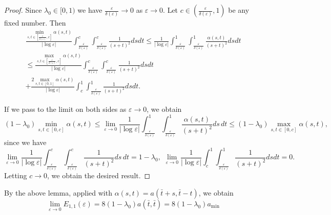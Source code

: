 \documentclass[12pt]{article}
\numberwithin{equation}{section}
\def\e{\varepsilon}
\begin{document}
\begin{proof}
Since $\lambda_{0}\in[0,1)$ we have $\frac{\varepsilon}{\delta(\varepsilon)}\to0$ as $\varepsilon\to0$.
Let $c\in(\frac{\varepsilon}{\delta(\varepsilon)},1)$ be any fixed number. Then
  \begin{multline*}
\frac{\min_{s,t\in[\frac{\varepsilon}{\delta(\varepsilon)},c]}\alpha(s,t)}{|\log\varepsilon|}\int_{\frac{\varepsilon}{\delta(\varepsilon)}}^{c}\int_{\frac{\varepsilon}{\delta(\varepsilon)}}^{c}\frac{1}{(s+t)^2}dsdt\leq\frac{1}{|\log\varepsilon|}\int_{\frac{\varepsilon}{\delta(\varepsilon)}}^{1}\int_{\frac{\varepsilon}{\delta(\varepsilon)}}^{1}\frac{
      \alpha\left(s,t\right)}{(s+t)^2}dsdt\\\leq\frac{\max_{s,t\in[\frac{\varepsilon}{\delta(\varepsilon)},c]}\alpha(s,t)}{|\log\varepsilon|}\int_{\frac{\varepsilon}{\delta(\varepsilon)}}^{c}\int_{\frac{\varepsilon}{\delta(\varepsilon)}}^{c}\frac{1}{(s+t)^2}dsdt\\+\frac{2\max_{s,t\in[0,1]}\alpha(s,t)}{|\log\varepsilon|}\int_{c}^{1}\int_{\frac{\varepsilon}{\delta(\varepsilon)}}^{1}\frac{1}{(s+t)^2}dsdt.
  \end{multline*}
  
  If we pass to the limit on both sides as $\varepsilon\to 0$, we obtain
  \begin{equation*}
      (1-\lambda_{0})\min_{s,t\in[0,c]}\alpha(s,t)\leq\lim_{\varepsilon\to 0}\frac{1}{|\log\varepsilon|}\int_{\frac{\varepsilon}{\delta(\varepsilon)}}^{1}\int_{\frac{\varepsilon}{\delta(\varepsilon)}}^{1}\frac{\alpha\left(s,t\right)}{(s+t)^2}ds\,dt\leq(1-\lambda_{0})\max_{s,t\in[0,c]}\alpha(s,t),
  \end{equation*}
  since we have
  \[
  \lim_{\varepsilon\to0}\frac{1}{|\log\varepsilon|}\int_{\frac{\varepsilon}{\delta(\varepsilon)}}^{c}\int_{\frac{\varepsilon}{\delta(\varepsilon)}}^{c}\frac{1}{(s+t)^2}ds\,dt=1-\lambda_{0},\,\, \lim_{\e\to0} \frac{1}{|\log\varepsilon|}\int_{c}^{1}\int_{\frac{\varepsilon}{\delta(\varepsilon)}}^{1}\frac{1}{(s+t)^2}dsdt=0.
  \]
  Letting $c\to0$, we obtain the desired result.
\end{proof}

By the above lemma, applied with $\alpha(s,t)= a(\bar{t}+s,\bar{t}-t)$, we obtain
\begin{equation*}
    \lim_{\varepsilon\to0}E_{1,1}(\varepsilon)=8(1-\lambda_{0}) a(\bar{t},\bar{t})=8(1-\lambda_{0})a_{\min}
\end{equation*}
\end{document}
